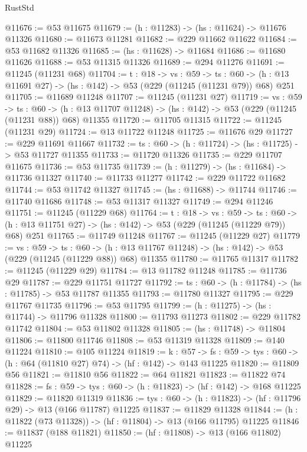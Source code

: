 \begin{lexlean}{RustStd}
\begin{coremodule}
@11676 := @53 @11675
@11679 := (h : @11283) -> (hs : @11624) -> @11676 @11326
@11680 := @11673 @11281
@11682 := @229 @11662 @11622
@11684 := @53 @11682 @11326
@11685 := (hs : @11628) -> @11684
@11686 := @11680 @11626
@11688 := @53 @11315 @11326
@11689 := @294 @11276
@11691 := @11245 (@11231 @68)
@11704 := {t : @18} ->
  {vs : @59} ->
  {ts : @60} -> (h : @13 @11691 @27) -> (hs : @142) -> @53 (@229 (@11245 (@11231 @79)) @68) @251
@11705 := @11689 @11248
@11707 := @11245 (@11231 @27)
@11719 := {vs : @59} ->
  {ts : @60} ->
  (h : @13 @11707 @11248) -> (hs : @142) -> @53 (@229 (@11245 (@11231 @88)) @68) @11355
@11720 := @11705 @11315
@11722 := @11245 (@11231 @29)
@11724 := @13 @11722 @11248
@11725 := @11676 @29
@11727 := @229 @11691 @11667
@11732 := {ts : @60} -> (h : @11724) -> (hs : @11725) -> @53 @11727 @11355
@11733 := @11720 @11326
@11735 := @229 @11707 @11675
@11736 := @53 @11735
@11739 := (h : @11279) -> (hs : @11684) -> @11736 @11327
@11740 := @11733 @11277
@11742 := @229 @11722 @11682
@11744 := @53 @11742 @11327
@11745 := (hs : @11688) -> @11744
@11746 := @11740 @11686
@11748 := @53 @11317 @11327
@11749 := @294 @11246
@11751 := @11245 (@11229 @68)
@11764 := {t : @18} ->
  {vs : @59} ->
  {ts : @60} -> (h : @13 @11751 @27) -> (hs : @142) -> @53 (@229 (@11245 (@11229 @79)) @68) @251
@11765 := @11749 @11248
@11767 := @11245 (@11229 @27)
@11779 := {vs : @59} ->
  {ts : @60} ->
  (h : @13 @11767 @11248) -> (hs : @142) -> @53 (@229 (@11245 (@11229 @88)) @68) @11355
@11780 := @11765 @11317
@11782 := @11245 (@11229 @29)
@11784 := @13 @11782 @11248
@11785 := @11736 @29
@11787 := @229 @11751 @11727
@11792 := {ts : @60} -> (h : @11784) -> (hs : @11785) -> @53 @11787 @11355
@11793 := @11780 @11327
@11795 := @229 @11767 @11735
@11796 := @53 @11795
@11799 := (h : @11275) -> (hs : @11744) -> @11796 @11328
@11800 := @11793 @11273
@11802 := @229 @11782 @11742
@11804 := @53 @11802 @11328
@11805 := (hs : @11748) -> @11804
@11806 := @11800 @11746
@11808 := @53 @11319 @11328
@11809 := @140 @11224
@11810 := @105 @11224
@11819 := {k : @57} ->
  {fs : @59} -> {tys : @60} -> (h : @64 (@11810 @27) @74) -> (hf : @142) -> @143 @11225
@11820 := @11809 @56
@11821 := @11810 @56
@11822 := @64 @11821
@11823 := @11822 @74
@11828 := {fs : @59} -> {tys : @60} -> (h : @11823) -> (hf : @142) -> @168 @11225
@11829 := @11820 @11319
@11836 := {tys : @60} -> (h : @11823) -> (hf : @11796 @29) -> @13 (@166 @11787) @11225
@11837 := @11829 @11328
@11844 := (h : @11822 (@73 @11328)) -> (hf : @11804) -> @13 (@166 @11795) @11225
@11846 := @11837 (@188 @11821)
@11850 := (hf : @11808) -> @13 (@166 @11802) @11225

\end{coremodule}
\end{lexlean}
